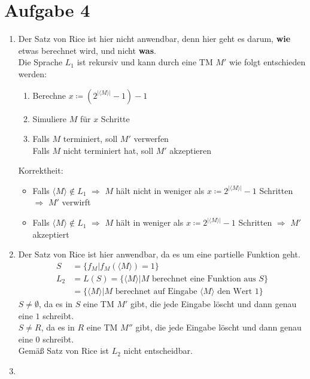 \documentclass[a4paper,11pt]{scrartcl}
\begin{document}
	\section*{Aufgabe 4}
	\begin{enumerate}[label=(\alph*)]
	\item	Der Satz von Rice ist hier nicht anwendbar, denn hier geht es darum, \textbf{wie} etwas berechnet wird, und nicht \textbf{was}.\\
			Die Sprache $L_1$ ist rekursiv und kann durch eine TM $M'$ wie folgt entschieden werden:
			\begin{enumerate}[label=\arabic*)]
			\item Berechne $x \coloneqq (2^{\vert \langle M \rangle \vert} - 1) - 1$
			\item Simuliere $M$ für $x$ Schritte
			\item Falls $M$ terminiert, soll $M'$ verwerfen\\
				  Falls $M$ nicht terminiert hat, soll $M'$ akzeptieren
			\end{enumerate}
			Korrektheit:
			\begin{itemize}
			\item Falls $\langle M \rangle \not\in L_1$ $\Rightarrow$ $M$ hält nicht in weniger als $x \coloneqq 2^{\vert \langle M \rangle \vert} - 1$ Schritten $\Rightarrow$ $M'$ verwirft
			\item Falls $\langle M \rangle \not\in L_1$ $\Rightarrow$ $M$ hält in weniger als $x \coloneqq 2^{\vert \langle M \rangle \vert} - 1$ Schritten $\Rightarrow$ $M'$ akzeptiert
			\end{itemize}
	
	\item	Der Satz von Rice ist hier anwendbar, da es um eine partielle Funktion geht.\\
			\begin{align*}
			S &=\{f_M \vert f_M(\langle M \rangle) = 1\}\\
			L_2 &= L(S) = \{\langle M \rangle \vert M \text{ berechnet eine Funktion aus } S\}\\
				&= \{\langle M \rangle \vert M \text{ berechnet auf Eingabe } \langle M \rangle \text{ den Wert } 1 \}
			\end{align*}
			$S \neq \emptyset$, da es in $S$ eine TM $M'$ gibt, die jede Eingabe löscht und dann genau eine $1$ schreibt.\\
			$S \neq R$, da es in $R$ eine TM $M''$ gibt, die jede Eingabe löscht und dann genau eine $0$ schreibt.\\
			Gemäß Satz von Rice ist $L_2$ nicht entscheidbar.
	
	\item	
	
	\end{enumerate}
	
\end{document}
